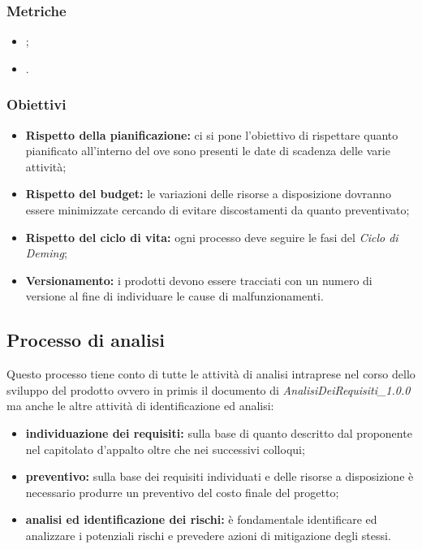\subsubsection{Metriche}

\begin{itemize}
    \item {};
    \item {}.
\end{itemize}

\subsubsection{Obiettivi}
\begin{itemize}
    \item \textbf{Rispetto della pianificazione:} ci si pone l'obiettivo di rispettare quanto pianificato all'interno del 
          ove sono presenti le date di scadenza delle varie attività;
    \item \textbf{Rispetto del budget:} le variazioni delle risorse a disposizione dovranno essere minimizzate cercando di evitare discostamenti da quanto preventivato;
    \item \textbf{Rispetto del ciclo di vita:} ogni processo deve seguire le fasi del \textit{Ciclo di Deming};
    \item \textbf{Versionamento:} i prodotti devono essere tracciati con un numero di versione al fine di individuare le cause di malfunzionamenti.
\end{itemize}

\subsection{Processo di analisi}
Questo processo tiene conto di tutte le attività di analisi intraprese nel corso dello sviluppo del prodotto ovvero in primis il documento di \textit{AnalisiDeiRequisiti\_1.0.0}
ma anche le altre attività di identificazione ed analisi:

\begin{itemize}
    \item  \textbf{individuazione dei requisiti:} sulla base di quanto descritto dal proponente nel capitolato d'appalto oltre che nei successivi colloqui;
    \item \textbf{preventivo:} sulla base dei requisiti individuati e delle risorse a disposizione è necessario produrre un preventivo del costo finale del progetto;
    \item \textbf{analisi ed identificazione dei rischi:} è fondamentale identificare ed analizzare i potenziali rischi e prevedere azioni di mitigazione degli stessi.
\end{itemize}

